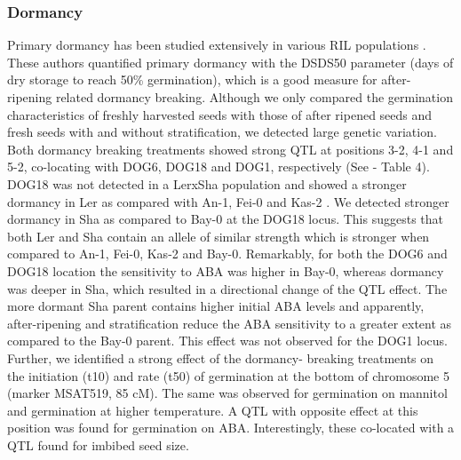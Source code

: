 \subsubsection{Dormancy}
Primary dormancy has been studied extensively in various RIL populations \cite{Bentsink:2010}. These 
authors quantified primary dormancy with the DSDS50 parameter (days of dry storage to reach 50\% 
germination), which is a good measure for after-ripening related dormancy breaking. Although we only 
compared the germination characteristics of freshly harvested seeds with those of after ripened 
seeds and fresh seeds with and without stratification, we detected large genetic variation. Both 
dormancy breaking treatments showed strong QTL at positions 3-2, 4-1 and 5-2, co-locating with DOG6, 
DOG18 and DOG1, respectively (See \cite{Joosen:2011} - Table 4). DOG18 was not detected in a LerxSha population and showed a 
stronger dormancy in Ler as compared with An-1, Fei-0 and Kas-2 \cite{Bentsink:2010}. We detected stronger 
dormancy in Sha as compared to Bay-0 at the DOG18 locus. This suggests that both Ler and Sha contain 
an allele of similar strength which is stronger when compared to An-1, Fei-0,  Kas-2 and Bay-0. Remarkably, 
for both the DOG6 and DOG18 location the sensitivity to ABA was higher in Bay-0, whereas dormancy was 
deeper in Sha, which resulted in a directional change of the QTL effect. The more dormant Sha parent 
contains higher initial ABA levels and apparently, after-ripening and 
stratification reduce the ABA sensitivity to a greater extent as compared to the Bay-0 parent. This 
effect was not observed for the DOG1 locus. Further, we identified a strong effect of the dormancy-
breaking treatments on the initiation (t10) and rate (t50) of germination at the bottom of chromosome 5 
(marker MSAT519, 85 cM). The same was observed for germination on mannitol and germination at higher 
temperature. A QTL with opposite effect at this position was found for germination on ABA. Interestingly, 
these co-located with a QTL found for imbibed seed size. 

